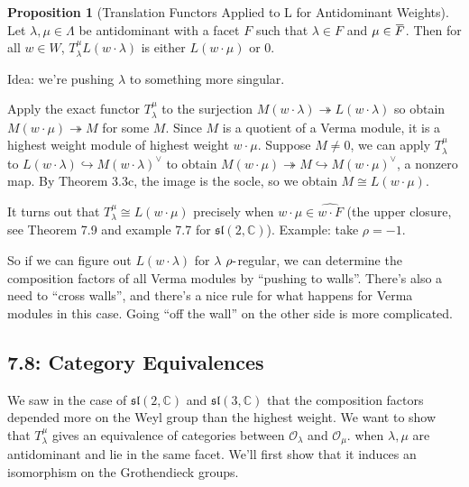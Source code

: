 \documentclass[11pt]{scrartcl}
\theoremstyle{definition}
\theoremstyle{theorem}
\newtheorem{proposition}[theorem]{Proposition}
\theoremstyle{proof}
\newenvironment{proof}
{\pushQED{$\qed$}\pf}
{\par\popQED\endpf}
\theoremstyle{definition}
\theoremstyle{break}
\theoremstyle{problem}
\newcommand{\CC}[0]{{\mathbb{C}}}
\newcommand{\dash}[0]{{\hbox{-}}}
\newcommand{\dual}[0]{^\vee}
\newcommand{\injects}[0]{\hookrightarrow}
\newcommand{\liesl}[0]{{\mathfrak{sl}}}
\newcommand{\OO}[0]{{\mathcal{O}}}
\newcommand{\surjects}[0]{\twoheadrightarrow}
\renewcommand{\bar}[1]{\mkern 1.5mu\overline{\mkern-1.5mu#1\mkern-1.5mu}\mkern 1.5mu}
\renewcommand{\hat}[1]{\widehat{#1}}
\renewcommand{\qed}[0]{\hfill\blacksquare}
\begin{document}
\begin{proposition}[Translation Functors Applied to L for Antidominant Weights]

Let \(\lambda, \mu \in \Lambda\) be antidominant with a facet \(F\) such
that \(\lambda \in F\) and \(\mu \in \bar F\). Then for all \(w\in W\),
\(T_\lambda^\mu L(w\cdot \lambda)\) is either \(L(w\cdot \mu)\) or
0.\end{proposition}

Idea: we're pushing \(\lambda\) to something more singular.

\begin{proof}

Apply the exact functor \(T_\lambda^\mu\) to the surjection
\(M(w\cdot \lambda) \surjects L(w\cdot \lambda)\) so obtain
\(M(w\cdot \mu) \surjects M\) for some \(M\). Since \(M\) is a quotient
of a Verma module, it is a highest weight module of highest weight
\(w\cdot \mu\). Suppose \(M\neq 0\), we can apply \(T_\lambda^\mu\) to
\(L(w\cdot \lambda) \injects M(w\cdot \lambda) \dual\) to obtain
\(M(w\cdot \mu) \surjects M \injects M(w\cdot \mu) \dual\), a nonzero
map. By Theorem 3.3c, the image is the socle, so we obtain
\(M \cong L(w\cdot \mu)\).\end{proof}

It turns out that \(T_\lambda^\mu \cong L(w\cdot \mu)\) precisely when
\(w\cdot \mu \in \hat{w\cdot F}\) (the upper closure, see Theorem 7.9
and example 7.7 for \(\liesl(2, \CC)\)). Example: take \(\rho = -1\).

So if we can figure out \(L(w\cdot \lambda)\) for \(\lambda\)
\(\rho\dash\)regular, we can determine the composition factors of all
Verma modules by ``pushing to walls''. There's also a need to ``cross
walls'', and there's a nice rule for what happens for Verma modules in
this case. Going ``off the wall'' on the other side is more complicated.

\hypertarget{category-equivalences}{%
\subsection{7.8: Category Equivalences}\label{category-equivalences}}

We saw in the case of \(\liesl(2, \CC)\) and \(\liesl(3, \CC)\) that the
composition factors depended more on the Weyl group than the highest
weight. We want to show that \(T_\lambda^\mu\) gives an equivalence of
categories between \(\OO_\lambda\) and \(\OO_\mu\). when
\(\lambda, \mu\) are antidominant and lie in the same facet. We'll first
show that it induces an isomorphism on the Grothendieck groups.
\end{document}
